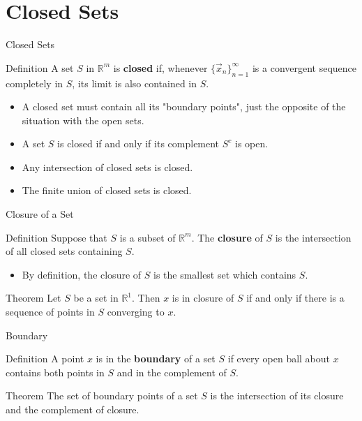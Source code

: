 \documentclass{beamer}
\begin{document}
\section{Closed Sets}
\begin{frame}{Closed Sets}
    \begin{block}{Definition}
    A set $S$ in $\mathbb{R}^m$ is \textbf{closed} if, whenever $\{\vec{x}_n\}_{n=1}^\infty$ is a convergent sequence completely in $S$, its limit is also contained in $S$.
    \end{block}
    \begin{itemize}
        \item A closed set must contain all its "boundary points", just the opposite of the situation with the open sets. 
        \item A set $S$ is closed if and only if its complement $S^c$ is open. 
        \item Any intersection of closed sets is closed. 
        \item The finite union of closed sets is closed. 
    \end{itemize}
\end{frame}

\begin{frame}{Closure of a Set}
\begin{block}{Definition}
Suppose that $S$ is  a subset of $\mathbb{R}^m$. The \textbf{closure} of $S$ is the intersection of all closed sets containing $S$. 
\end{block}
    \begin{itemize}
        \item By definition, the closure of $S$ is the smallest set which contains $S$. 
        
    \end{itemize}
    \begin{block}{Theorem}
    Let $S $ be a set in $\mathbb{R}^1$. Then $x$ is in closure of $S$ if and only if there is a sequence of points in $S$ converging to $x$. 
    \end{block}
\end{frame}

\begin{frame}{Boundary}
    \begin{block}{Definition}
    A point $x$ is in the \textbf{boundary } of a set $S$ if every open ball about $x$ contains both points in $S$ and in the complement of $S$. 
    \end{block}
    \begin{block}{Theorem}
    The set of boundary points of a set $S$ is the intersection of its closure and the complement of closure. 
    \end{block}
\end{frame}
\end{document}
